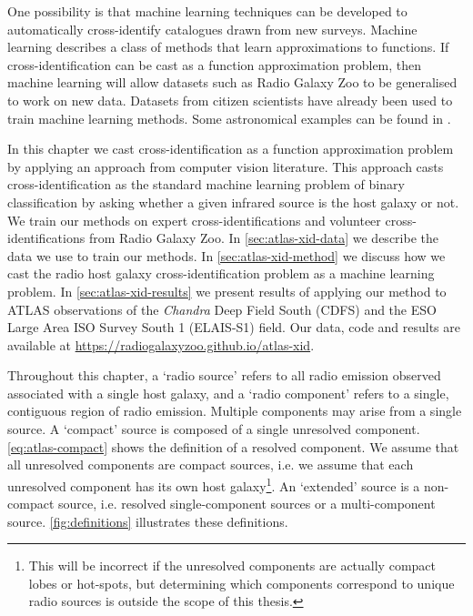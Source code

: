     {One possibility is that machine learning techniques can
    be developed to automatically cross-identify catalogues drawn from new surveys}. Machine learning
    describes a class of methods that learn approximations to functions. {If
    cross-identification can be cast as a function approximation problem, then machine learning will allow datasets
    such as Radio Galaxy Zoo to be generalised to work on new data. Datasets from
    citizen scientists have already been used to train machine learning methods.
    Some astronomical examples can be found in \citet{marshall15citizen}.}

    In this chapter we {cast cross-identification as a function
    approximation problem by} applying an approach from computer vision
    literature. This approach casts cross-identification as the standard machine
    learning problem of binary classification {by asking whether a given
    infrared source is the host galaxy or not}. We train our methods on expert
    cross-identifications and volunteer cross-identifications from Radio Galaxy Zoo. In
    \autoref{sec:atlas-xid-data} we describe the data we use to train our methods. In
    \autoref{sec:atlas-xid-method} we discuss how we cast the radio host galaxy
    cross-identification problem as a machine learning problem. In
    \autoref{sec:atlas-xid-results} we present results of applying our method to ATLAS
    observations of the \emph{Chandra} Deep Field South (CDFS) and the ESO Large Area ISO Survey South 1 (ELAIS-S1) field. Our data, code and results are
    available at \url{https://radiogalaxyzoo.github.io/atlas-xid}.

    {Throughout this chapter, a `radio source' refers to all radio emission observed associated with a single host galaxy, and a `radio component' refers to a single, contiguous
    region of radio emission. Multiple components may arise from a single
    source. A `compact' source is composed of a {single unresolved component. \autoref{eq:atlas-compact} shows the definition of a resolved component. We
    assume that all unresolved components are compact sources, i.e. we assume that each unresolved component has its own host galaxy\footnote{{This will be incorrect if the unresolved components are actually compact lobes or hot-spots, but determining which components correspond to unique radio sources is outside the scope of this thesis.}}.} An `extended'
    source is a non-compact source, i.e. resolved single-component sources or a
    multi-component source. \autoref{fig:definitions} illustrates these definitions.}

